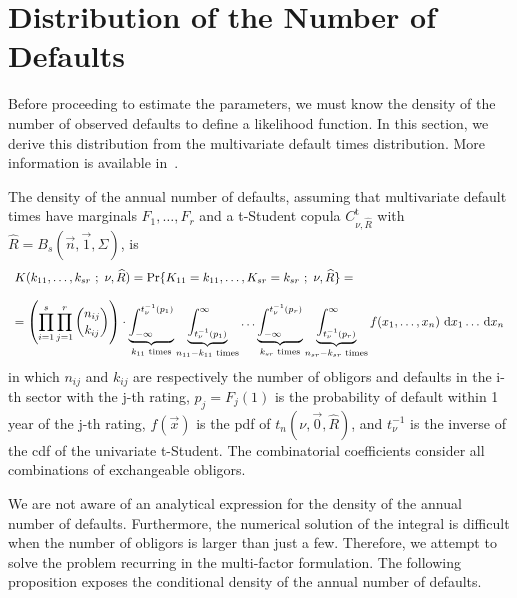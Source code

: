 \documentclass[11pt,fleqn]{book} %
\begin{document}
\section{Distribution of the Number of Defaults}

Before proceeding to estimate the parameters, we must know the density
of the number of observed defaults to define a likelihood function. In 
this section, we derive this distribution from the multivariate default 
times distribution. More information is available 
in~\cite{gordy:2002,roncalli:2004}.

\begin{proposition}
	The density of the annual number of defaults, assuming that multivariate 
	default times have marginals $F_1,\dots,F_r$ and a t-Student copula 
	$C_{\nu,\widehat{R}}^{\text{t}}$ with 
	$\widehat{R} = B_s(\vec{n},\vec{1},\Sigma)$, is
	\begin{displaymath}
		\begin{array}{l}
			K(k_{11},\dots,k_{sr}\ ;\ \nu, \widehat{R}) = 
			\Pr\{K_{11}=k_{11},\dots,K_{sr}=k_{sr}\ ;\ \nu, \widehat{R}\} = \\
			\\
			= \left( \displaystyle \prod_{i=1}^s \prod_{j=1}^r \binom{n_{ij}}{k_{ij}} \right) \cdot
			\displaystyle
			\underbrace{\int_{-\infty}^{t_{\nu}^{-1}(p_1)}}_{k_{11} \text{ times}}
			\underbrace{\int_{t_{\nu}^{-1}(p_1)}^{\infty}}_{n_{11}-k_{11} \text{ times}}
			\dots
			\underbrace{\int_{-\infty}^{t_{\nu}^{-1}(p_r)}}_{k_{sr} \text{ times}}
			\underbrace{\int_{t_{\nu}^{-1}(p_r)}^{\infty}}_{n_{sr}-k_{sr} \text{ times}}
			f(x_1,\dots,x_n) \mathop{\,\mathrm{{}d}}\mathopen{} x_1 \dots \mathop{\,\mathrm{{}d}}\mathopen{} x_n
		\end{array}
	\end{displaymath}
	in which $n_{ij}$ and $k_{ij}$ are respectively the number of obligors and 
	defaults in the i-th sector with the j-th rating, $p_j = F_j(1)$ is the 
	probability of default within 1 year of the j-th rating, $f(\vec{x})$ 
	is the pdf of $t_n(\nu,\vec{0},\widehat{R})$, and $t_{\nu}^{-1}$ is the 
	inverse of the cdf of the univariate t-Student. The combinatorial 
	coefficients consider all combinations of exchangeable obligors.
\end{proposition}

We are not aware of an analytical expression for the density of the annual 
number of defaults. Furthermore, the numerical solution of the integral is 
difficult when the number of obligors is larger than just a few. Therefore,
we attempt to solve the problem recurring in the multi-factor formulation. 
The following proposition exposes the conditional density of the annual 
number of defaults.
\end{document}
